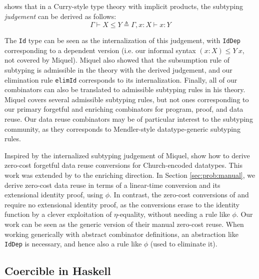 \documentclass[acmsmall,screen]{acmart}
\newcommand{\refsec}[1]{Section \ref{sec:#1}}
\newcommand{\labsec}[1]{\label{sec:#1}}
\begin{document}
\citet{miquel01} shows that in a Curry-style type theory with implicit
products, the subtyping \textit{judgement} can be derived as follows:
$$
\Gamma\vdash X \leq Y \triangleq \Gamma,x:X\vdash x:Y
$$

The \verb;Id; type can be seen as the internalization of this
judgement, with \verb;IdDep; corresponding to a dependent version
(i.e. our informal syntax $(x:X) \leq Y~x$, not covered by Miquel).
Miquel also showed that the subsumption rule of subtyping is
admissible in the theory with the derived judgement, and our
elimination rule \verb;elimId; corresponds to its internalization.
Finally, all of our combinators can also be translated to admissible
subtyping rules in his theory. Miquel covers several admissible
subtyping rules, but not ones corresponding to our primary forgetful
and enriching combinators for program, proof, and data reuse. Our data
reuse combinators may be of particular interest to the subtyping
community, as they corresponds to Mendler-style datatype-generic
subtyping rules.

Inspired by the internalized subtyping judgement of Miquel,
\citet{barras:implicit} show how to derive zero-cost forgetful data
reuse conversions for Church-encoded datatypes.
This work was extended by \citet{diehl} to the enriching direction.
In \refsec{prob:manual}, we derive zero-cost data reuse in terms of a
linear-time conversion and its extensional identity proof, using
$\phi$. In contrast, the zero-cost conversions of
\citet{barras:implicit} and \citet{diehl} require no extensional
identity proof, as the conversions erase to the identity function by a
clever exploitation of $\eta$-equality, without needing a rule like
$\phi$. Our work can be seen as the generic version of their manual
zero-cost reuse. When working generically with abstract combinator
definitions, an abstraction like \verb;IdDep; is necessary,
and hence also a rule like $\phi$ (used to eliminate it).



\subsection{Coercible in Haskell}
\labsec{others:hask}
\end{document}
